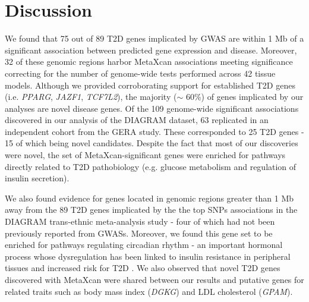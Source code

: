 \documentclass[10pt]{article}
\begin{document}
\section*{Discussion}

We found that 75 out of 89 T2D genes implicated by GWAS are within 1 Mb of a significant association between predicted gene expression and disease. Moreover, 32 of these genomic regions harbor MetaXcan associations meeting significance correcting for the number of genome-wide tests performed across 42 tissue models. Although we provided corroborating support for established T2D genes (i.e. \textit{PPARG}, \textit{JAZF1}, \textit{TCF7L2}), the majority ($\sim$ 60\%) of genes implicated by our analyses are novel disease genes. Of the 109 genome-wide significant associations discovered in our analysis of the DIAGRAM dataset, 63 replicated in an independent cohort from the GERA study. These corresponded to 25 T2D genes - 15 of which being novel candidates. Despite the fact that most of our discoveries were novel, the set of MetaXcan-significant genes were enriched for pathways directly related to T2D pathobiology (e.g. glucose metabolism and regulation of insulin secretion).

We also found evidence for genes located in genomic regions greater than 1 Mb away from the 89 T2D genes implicated by the the top SNPs associations in the DIAGRAM trans-ethnic meta-analysis study - four of which had not been previously reported from GWASs. Moreover, we found this gene set to be enriched for pathways regulating circadian rhythm - an important hormonal process whose dysregulation has been linked to insulin resistance in peripheral tissues and increased risk for T2D \cite{Broussard2012,Depner2014,Eckel2015}. We also observed that novel T2D genes discovered with MetaXcan were shared between our results and putative genes for related traits such as body mass index (\textit{DGKG}) and LDL cholesterol (\textit{GPAM}). 
\end{document}
